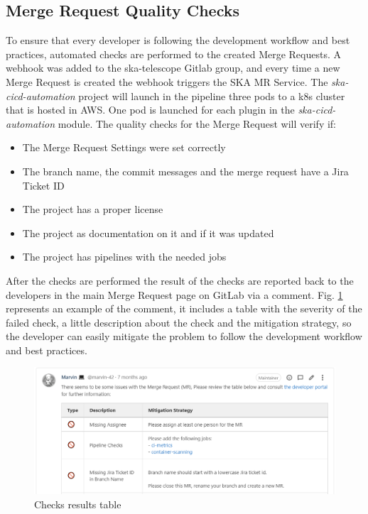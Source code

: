 \documentclass[a4paper,
               keeplastbox,   %
               ]{jacow}
\begin{document}
 
 \subsection{Merge Request Quality Checks}
 
 To ensure that every developer is following the development workflow and best practices, automated checks are performed to the created Merge Requests. A webhook was added to the ska-telescope Gitlab group, and every time a new Merge Request is created the webhook triggers the SKA MR Service. The \textit{ska-cicd-automation} project will launch in the pipeline three pods to a k8s cluster that is hosted in AWS. One pod is launched for each plugin in the \textit{ska-cicd-automation} module. The quality checks for the Merge Request will verify if:
 
 \begin{itemize}
     \item The Merge Request Settings were set correctly
     \item The branch name, the commit messages and the merge request have a Jira Ticket ID
     \item The project has a proper license
     \item The project as documentation on it and if it was updated
     \item The project has pipelines with the needed jobs
 \end{itemize}
 
 After the checks are performed the result of the checks are reported back to the developers in the main Merge Request page on GitLab via a comment. Fig. \ref{fig:marvin-table} represents an example of the comment, it includes a table with the severity of the failed check, a little description about the check and the mitigation strategy, so the developer can easily mitigate the problem to follow the development workflow and best practices. 
 
 \begin{figure}[!htb]
    \centering
    \includegraphics*[width=0.8\columnwidth]{marvin-table}
    \caption{Checks results table}
    \label{fig:marvin-table}
 \end{figure}
 
\end{document}
